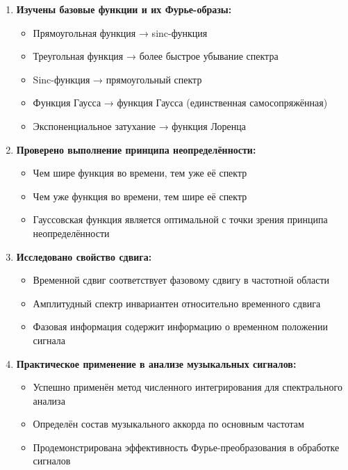 \begin{enumerate}
    \item \textbf{Изучены базовые функции и их Фурье-образы:}
    \begin{itemize}
        \item Прямоугольная функция → sinc-функция
        \item Треугольная функция → более быстрое убывание спектра
        \item Sinc-функция → прямоугольный спектр
        \item Функция Гаусса → функция Гаусса (единственная самосопряжённая)
        \item Экспоненциальное затухание → функция Лоренца
    \end{itemize}
    
    \item \textbf{Проверено выполнение принципа неопределённости:}
    \begin{itemize}
        \item Чем шире функция во времени, тем уже её спектр
        \item Чем уже функция во времени, тем шире её спектр
        \item Гауссовская функция является оптимальной с точки зрения принципа неопределённости
    \end{itemize}
    
    \item \textbf{Исследовано свойство сдвига:}
    \begin{itemize}
        \item Временной сдвиг соответствует фазовому сдвигу в частотной области
        \item Амплитудный спектр инвариантен относительно временного сдвига
        \item Фазовая информация содержит информацию о временном положении сигнала
    \end{itemize}
    
    \item \textbf{Практическое применение в анализе музыкальных сигналов:}
    \begin{itemize}
        \item Успешно применён метод численного интегрирования для спектрального анализа
        \item Определён состав музыкального аккорда по основным частотам
        \item Продемонстрирована эффективность Фурье-преобразования в обработке сигналов
    \end{itemize}
\end{enumerate}

